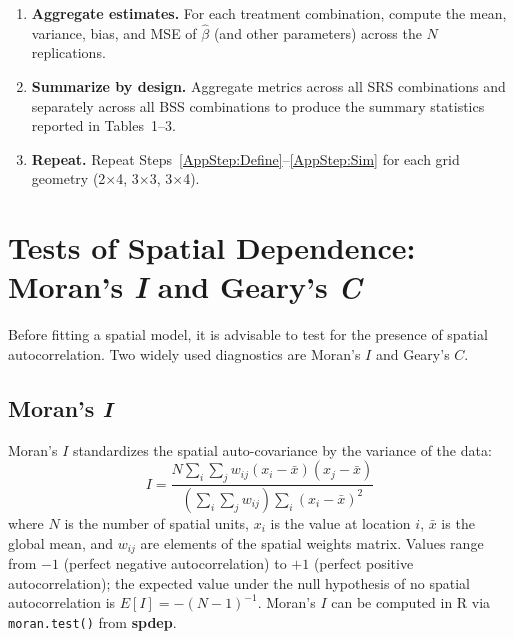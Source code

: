 \documentclass{article}[11pt]
\begin{document}
\begin{enumerate}
    \item \textbf{Aggregate estimates.} For each treatment combination, compute the mean, variance, bias, and MSE of $\hat\beta$ (and other parameters) across the $N$ replications.

    \item \textbf{Summarize by design.} Aggregate metrics across all SRS combinations and separately across all BSS combinations to produce the summary statistics reported in Tables~1--3.

    \item\label{AppStep:Repeat} \textbf{Repeat.} Repeat Steps~\ref{AppStep:Define}--\ref{AppStep:Sim} for each grid geometry (2$\times$4, 3$\times$3, 3$\times$4).
\end{enumerate}

\section{Tests of Spatial Dependence: Moran's \textit{I} and Geary's \textit{C}}\label{appendix:MoransI}

Before fitting a spatial model, it is advisable to test for the presence of spatial autocorrelation. Two widely used diagnostics are Moran's $\textit{I}$\cite{moran_interpretation_1948}\cite{moran_notes_1950} and Geary's $\textit{C}$\cite{geary_contiguity_1954}\cite{waller_applied_2004}.

\subsection*{Moran's \textit{I}}

Moran's $\textit{I}$ standardizes the spatial auto-covariance by the variance of the data:
\begin{equation}
    \textit{I} = \frac{N \displaystyle\sum_{i}\sum_{j} w_{ij}(x_i - \bar{x})(x_j - \bar{x})}
                       {\left(\displaystyle\sum_{i}\sum_{j} w_{ij}\right)\displaystyle\sum_{i}(x_i - \bar{x})^2}
\end{equation}
where $N$ is the number of spatial units, $x_i$ is the value at location $i$, $\bar{x}$ is the global mean, and $w_{ij}$ are elements of the spatial weights matrix. Values range from $-1$ (perfect negative autocorrelation) to $+1$ (perfect positive autocorrelation); the expected value under the null hypothesis of no spatial autocorrelation is $E[\textit{I}] = -(N-1)^{-1}$. Moran's $\textit{I}$ can be computed in R via \texttt{moran.test()} from \textbf{spdep}\cite{bivand_comparing_2018}.
\end{document}
